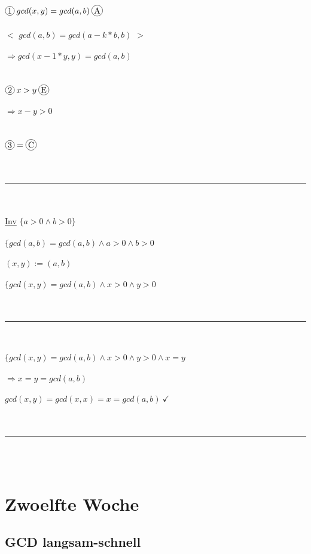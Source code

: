 \documentclass[18pt,a4paper]{article}
\newcommand*\circled[1]{\tikz[baseline=(char.base)]{
            \node[shape=circle,draw,inner sep=1pt] (char) {#1};}}
\newcommand{\tab}{\hspace*{2em}}
\begin{document}
\\
\\
\\
$\circled{1}\: gcd(x,y) = gcd(a,b)\: \circled{A}$\\
\\
\tab $<$ $gcd(a,b) = gcd(a-k*b,b)$ $>$\\
\\
$\Rightarrow gcd(x-1*y,y) = gcd(a,b)$\\
\\
\\
$\circled{2} \:x>y\: \circled{E}$\\
\\
$\Rightarrow x-y>0$\\
\\
\\
$\circled{3} = \circled{C}$\\
\\
\\
\rule{\textwidth}{0.4mm}\\
\\
\uline{Inv} $\{a>0 \wedge b>0\}$\\
\\
$\{ gcd(a,b) = gcd(a,b) \wedge a>0 \wedge b>0$\\
\\
$(x,y) := (a,b)$\\
\\
$\{ gcd(x,y) = gcd(a,b) \wedge x>0 \wedge y>0$\\
\\
\\
\rule{\textwidth}{0.4mm}\\
\\
$\{ gcd(x,y) = gcd(a,b) \wedge x>0 \wedge y>0 \wedge x=y$\\
\\
$\Rightarrow x=y=gcd(a,b)$\\
\\
$gcd(x,y) = gcd(x,x) = x = gcd(a,b)\: \checkmark$\\
\\
\\
\rule{\textwidth}{0.4mm}\\
\\

\section{Zwoelfte Woche}

\subsection{GCD langsam-schnell}
\end{document}
